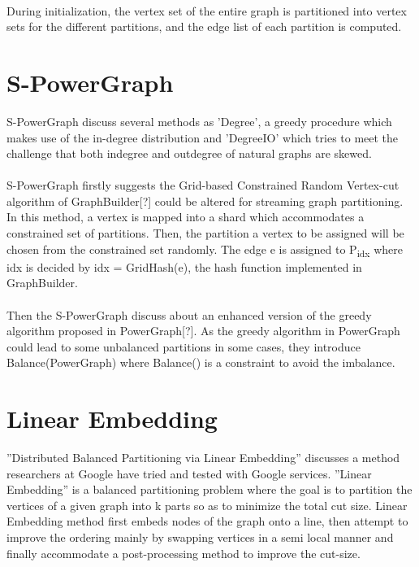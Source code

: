 \paragraph{}

During initialization, the vertex set of the entire graph is partitioned into vertex sets for the different partitions, and the edge list of each partition is computed. 

\section{S-PowerGraph}
S-PowerGraph\cite{S-PowerGraph} discuss several methods as ’Degree’, a greedy procedure which makes use of the in-degree distribution and ’DegreeIO’ which tries to meet the challenge that both indegree and outdegree of natural graphs are skewed. 

\paragraph{}

S-PowerGraph firstly suggests the Grid-based Constrained Random Vertex-cut algorithm of GraphBuilder[?] could be altered for streaming graph partitioning. In this method, a vertex is mapped into a shard which accommodates a constrained set of partitions. Then, the partition a vertex to be assigned will be chosen from the constrained set randomly. The edge e is assigned to P\textsubscript{idx} where idx is decided by idx = GridHash(e), the hash function implemented in GraphBuilder. 

\paragraph{}

Then the S-PowerGraph discuss about an enhanced version of the greedy algorithm proposed in PowerGraph[?]. As the greedy algorithm in PowerGraph could lead to some unbalanced partitions in some cases, they introduce Balance(PowerGraph) where Balance() is a constraint to avoid the imbalance.

\paragraph{}

\section{Linear Embedding}
”Distributed Balanced Partitioning via Linear Embedding”\cite{Linear Embedding} discusses a method researchers at Google have tried and tested with Google services. ”Linear Embedding” is a balanced partitioning problem where the goal is to partition the vertices of a given graph into k parts so as to minimize the total cut size. Linear Embedding method first embeds nodes of the graph onto a line, then attempt to improve the ordering mainly by swapping vertices in a semi local manner and finally accommodate a post-processing method to improve the cut-size.

